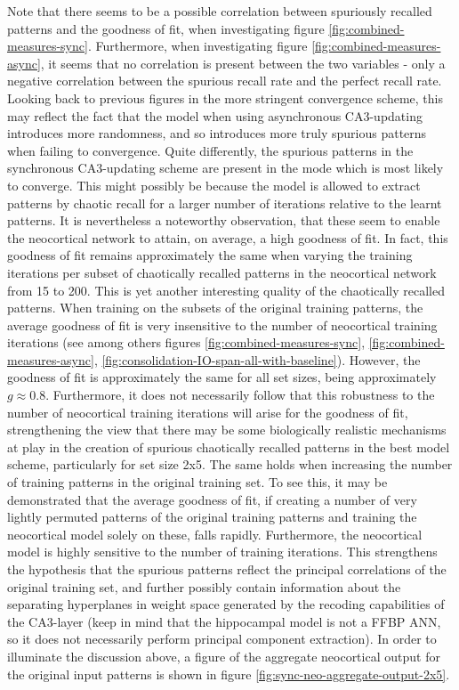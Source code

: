 Note that there seems to be a possible correlation between spuriously recalled patterns and the goodness of fit, when investigating figure \ref{fig:combined-measures-sync}. Furthermore, when investigating figure \ref{fig:combined-measures-async}, it seems that no correlation is present between the two variables - only a negative correlation between the spurious recall rate and the perfect recall rate. Looking back to previous figures in the more stringent convergence scheme, this may reflect the fact that the model when using asynchronous CA3-updating introduces more randomness, and so introduces more truly spurious patterns when failing to convergence. Quite differently, the spurious patterns in the synchronous CA3-updating scheme are present in the mode which is most likely to converge. This might possibly be because the model is allowed to extract patterns by chaotic recall for a larger number of iterations relative to the learnt patterns. 
It is nevertheless a noteworthy observation, that these seem to enable the neocortical network to attain, on average, a high goodness of fit. In fact, this goodness of fit remains approximately the same when varying the training iterations per subset of chaotically recalled patterns in the neocortical network from 15 to 200. This is yet another interesting quality of the chaotically recalled patterns. When training on the subsets of the original training patterns, the average goodness of fit is very insensitive to the number of neocortical training iterations  (see among others figures \ref{fig:combined-measures-sync}, \ref{fig:combined-measures-async}, \ref{fig:consolidation-IO-span-all-with-baseline}). However, the goodness of fit is approximately the same for all set sizes, being approximately $g\approx 0.8$. Furthermore, it does not necessarily follow that this robustness to the number of neocortical training iterations will arise for the goodness of fit, strengthening the view that there may be some biologically realistic mechanisms at play in the creation of spurious chaotically recalled patterns in the best model scheme, particularly for set size 2x5. The same holds when increasing the number of training patterns in the original training set. To see this, it may be demonstrated that the average goodness of fit, if creating a number of very lightly permuted patterns of the original training patterns and training the neocortical model solely on these, falls rapidly. Furthermore, the neocortical model is highly sensitive to the number of training iterations. This strengthens the hypothesis that the spurious patterns reflect the principal correlations of the original training set, and further possibly contain information about the separating hyperplanes in weight space generated by the recoding capabilities of the CA3-layer (keep in mind that the hippocampal model is not a FFBP ANN, so it does not necessarily perform principal component extraction). In order to illuminate the discussion above, a figure of the aggregate neocortical output for the original input patterns is shown in figure \ref{fig:sync-neo-aggregate-output-2x5}.

